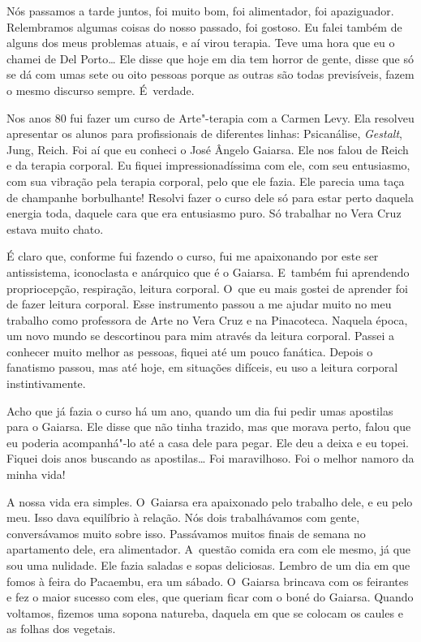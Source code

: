 Nós passamos a tarde juntos, foi muito bom, foi alimentador, foi
apaziguador. Relembramos algumas coisas do nosso passado, foi gostoso.
Eu falei também de alguns dos meus problemas atuais, e aí virou terapia.
Teve uma hora que eu o chamei de Del Porto… Ele disse que hoje em
dia tem horror de gente, disse que só se dá com umas sete ou oito
pessoas porque as outras são todas previsíveis, fazem o mesmo discurso
sempre. É~verdade.

Nos anos 80 fui fazer um curso de Arte"-terapia com a Carmen Levy. Ela
resolveu apresentar os alunos para profissionais de diferentes linhas:
Psicanálise, \emph{Gestalt}, Jung, Reich. Foi aí que eu conheci o José
Ângelo Gaiarsa. Ele nos falou de Reich e da terapia corporal. Eu fiquei
impressionadíssima com ele, com seu entusiasmo, com sua vibração pela
terapia corporal, pelo que ele fazia. Ele parecia uma taça de champanhe
borbulhante! Resolvi fazer o curso dele só para estar perto daquela
energia toda, daquele cara que era entusiasmo puro. Só trabalhar no Vera
Cruz estava muito chato.

É claro que, conforme fui fazendo o curso, fui me apaixonando por este
ser antissistema, iconoclasta e anárquico que é o Gaiarsa. E~também fui
aprendendo propriocepção, respiração, leitura corporal. O~que eu mais
gostei de aprender foi de fazer leitura corporal. Esse instrumento
passou a me ajudar muito no meu trabalho como professora de Arte no Vera
Cruz e na Pinacoteca. Naquela época, um novo mundo se descortinou para
mim através da leitura corporal. Passei a conhecer muito melhor as
pessoas, fiquei até um pouco fanática. Depois o fanatismo passou, mas
até hoje, em situações difíceis, eu uso a leitura corporal
instintivamente.

Acho que já fazia o curso há um ano, quando um dia fui pedir umas
apostilas para o Gaiarsa. Ele disse que não tinha trazido, mas que
morava perto, falou que eu poderia acompanhá"-lo até a casa dele para
pegar. Ele deu a deixa e eu topei. Fiquei dois anos buscando as
apostilas… Foi maravilhoso. Foi o melhor namoro da minha vida!

A nossa vida era simples. O~Gaiarsa era apaixonado pelo trabalho dele, e
eu pelo meu. Isso dava equilíbrio à relação. Nós dois trabalhávamos com
gente, conversávamos muito sobre isso. Passávamos muitos finais de
semana no apartamento dele, era alimentador. A~questão comida era com
ele mesmo, já que sou uma nulidade. Ele fazia saladas e sopas
deliciosas. Lembro de um dia em que fomos à feira do Pacaembu, era um
sábado. O~Gaiarsa brincava com os feirantes e fez o maior sucesso com
eles, que queriam ficar com o boné do Gaiarsa. Quando voltamos, fizemos
uma sopona natureba, daquela em que se colocam os caules e as folhas dos
vegetais.


